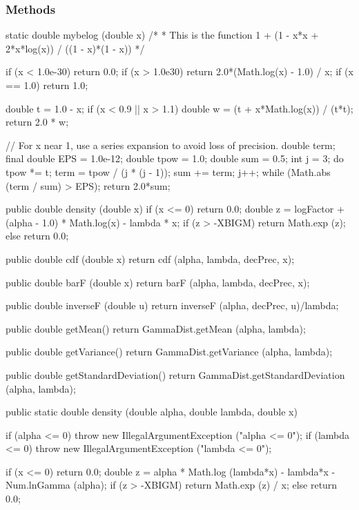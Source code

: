\subsubsection* {Methods}
\begin{hide}
\begin{code}

   static double mybelog (double x)
   /*
    * This is the function  1 + (1 - x*x + 2*x*log(x)) / ((1 - x)*(1 - x))
    */
   {
      if (x < 1.0e-30)
         return 0.0;
      if (x > 1.0e30)
         return 2.0*(Math.log(x) - 1.0) / x;
      if (x == 1.0)
         return 1.0;

      double t = 1.0 - x;
      if (x < 0.9 || x > 1.1) {
         double w = (t + x*Math.log(x)) / (t*t);
         return 2.0 * w;
      }

      // For x near 1, use a series expansion to avoid loss of precision.
      double term;
      final double EPS = 1.0e-12;
      double tpow = 1.0;
      double sum = 0.5;
      int j = 3;
      do {
         tpow *= t;
         term = tpow / (j * (j - 1));
         sum += term;
         j++;
      } while (Math.abs (term / sum) > EPS);
      return 2.0*sum;
   }


   public double density (double x) {
      if (x <= 0)
         return 0.0;
      double z = logFactor + (alpha - 1.0) * Math.log(x) - lambda * x;
      if (z > -XBIGM)
         return Math.exp (z);
      else
         return 0.0;
   }

   public double cdf (double x) {
      return cdf (alpha, lambda, decPrec, x);
   }

   public double barF (double x) {
      return barF (alpha, lambda, decPrec, x);
   }

   public double inverseF (double u) {
      return inverseF (alpha, decPrec, u)/lambda;
   }

   public double getMean() {
      return GammaDist.getMean (alpha, lambda);
   }

   public double getVariance() {
      return GammaDist.getVariance (alpha, lambda);
   }

   public double getStandardDeviation() {
      return GammaDist.getStandardDeviation (alpha, lambda);
   }
\end{code}
\end{hide}\begin{code}

   public static double density (double alpha, double lambda, double x)\begin{hide} {
      if (alpha <= 0)
         throw new IllegalArgumentException ("alpha <= 0");
      if (lambda <= 0)
         throw new IllegalArgumentException ("lambda <= 0");

      if (x <= 0)
         return 0.0;
      double z = alpha * Math.log (lambda*x) - lambda*x - Num.lnGamma (alpha);
      if (z > -XBIGM)
         return Math.exp (z) / x;
      else
         return 0.0;
   }\end{hide}
\end{code}
